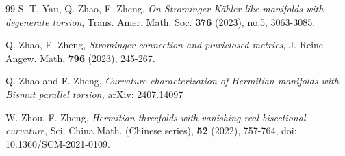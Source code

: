 \documentclass{amsart}
\numberwithin{equation}{section}
\theoremstyle{definition}
\renewcommand{\1}{\mathds{1}}
\renewcommand{\>}{\rightarrow}
\begin{document}
\begin{thebibliography}{99}
 S.-T. Yau, Q. Zhao, F. Zheng,
\newblock \textit{On Strominger K\"ahler-like manifolds with degenerate torsion},
\newblock Trans. Amer. Math. Soc. \textbf{376} (2023), no.5, 3063-3085.


 Q. Zhao, F. Zheng,
\newblock  \textit{Strominger connection and pluriclosed metrics},
\newblock J. Reine Angew. Math. \textbf{796} (2023), 245-267.


 Q. Zhao and F. Zheng, \emph{Curvature characterization of Hermitian manifolds with Bismut parallel torsion,}
arXiv: 2407.14097


 W. Zhou, F. Zheng,
\newblock \textit{Hermitian threefolds with vanishing real bisectional curvature},
\newblock Sci. China Math. (Chinese series), {\bf 52} (2022), 757-764, doi: 10.1360/SCM-2021-0109.




\end{thebibliography}
\end{document}
